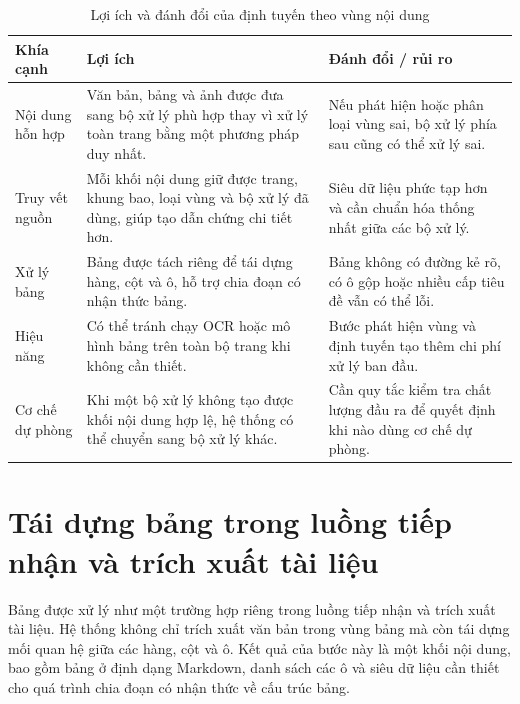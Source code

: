 \documentclass[../DoAn.tex]{subfiles}
\begin{document}
\begin{table}[H]
\centering
\small
\renewcommand{\arraystretch}{1.2}
\caption{Lợi ích và đánh đổi của định tuyến theo vùng nội dung}
\label{tab:region-routing-tradeoff}
\begin{tabularx}{\textwidth}{
    |>{\raggedright\arraybackslash}p{}
    |>{\raggedright\arraybackslash}X
    |>{\raggedright\arraybackslash}X|
}
\hline
\textbf{Khía cạnh} & \textbf{Lợi ích} & \textbf{Đánh đổi / rủi ro} \\
\hline
Nội dung hỗn hợp &
Văn bản, bảng và ảnh được đưa sang bộ xử lý phù hợp thay vì xử lý toàn trang
bằng một phương pháp duy nhất. &
Nếu phát hiện hoặc phân loại vùng sai, bộ xử lý phía sau cũng có thể xử lý sai. \\
\hline
Truy vết nguồn &
Mỗi khối nội dung giữ được trang, khung bao, loại vùng và bộ xử lý đã dùng, giúp tạo dẫn chứng
chi tiết hơn. &
Siêu dữ liệu phức tạp hơn và cần chuẩn hóa thống nhất giữa các bộ xử lý. \\
\hline
Xử lý bảng &
Bảng được tách riêng để tái dựng hàng, cột và ô, hỗ trợ chia đoạn có nhận thức bảng. &
Bảng không có đường kẻ rõ, có ô gộp hoặc nhiều cấp tiêu đề vẫn có thể lỗi. \\
\hline
Hiệu năng &
Có thể tránh chạy OCR hoặc mô hình bảng trên toàn bộ trang khi không cần thiết. &
Bước phát hiện vùng và định tuyến tạo thêm chi phí xử lý ban đầu. \\
\hline
Cơ chế dự phòng &
Khi một bộ xử lý không tạo được khối nội dung hợp lệ, hệ thống có thể chuyển sang bộ xử
lý khác. &
Cần quy tắc kiểm tra chất lượng đầu ra để quyết định khi nào dùng cơ chế dự phòng. \\
\hline
\end{tabularx}
\end{table}

\section{Tái dựng bảng trong luồng tiếp nhận và trích xuất tài liệu}
\label{section:chapter4-table-reconstruction}

Bảng được xử lý như một trường hợp riêng trong luồng tiếp nhận và trích xuất tài liệu. Hệ thống không chỉ trích xuất văn bản trong vùng bảng mà còn tái dựng mối quan hệ giữa các hàng, cột và ô. Kết quả của bước này là một khối nội dung, bao gồm bảng ở định dạng Markdown, danh sách các ô và siêu dữ liệu cần thiết cho quá trình chia đoạn có nhận thức về cấu trúc bảng.
\end{document}
